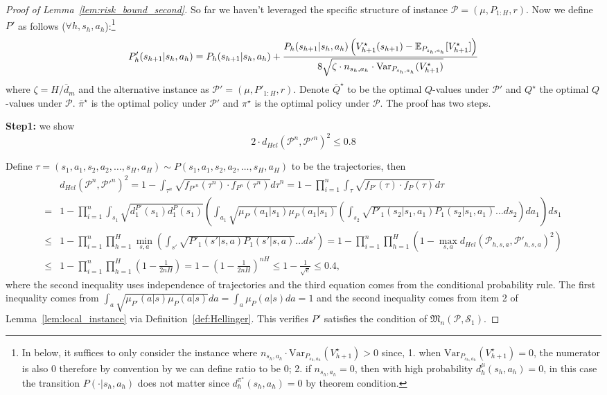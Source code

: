 \begin{proof}[Proof of Lemma~\ref{lem:risk_bound_second}]
So far we haven't leveraged the specific structure of instance $\mathcal{P}=(\mu,P_{1:H},r)$. Now we define $P'$ as follows ($\forall h,s_h,a_h$):\footnote{In below, it suffices to only consider the instance where $n_{s_h,a_h}\cdot\mathrm{Var}_{P_{s_h,a_h}}(V^\star_{h+1})>0$ since, 1. when $\mathrm{Var}_{P_{s_h,a_h}}(V^\star_{h+1})=0$, the numerator is also $0$ therefore by convention by we can define ratio to be $0$; 2. if $n_{s_h,a_h}=0$, then with high probability $d^\mu_h(s_h,a_h)=0$, in this case the transition $P(\cdot|s_h,a_h)$ does not matter since $d^{\pi^\star}_h(s_h,a_h)=0$ by theorem condition.}
\begin{equation}\label{eqn:definition_of_P_prime}
P'_h(s_{h+1}|s_h,a_h)=P_h(s_{h+1}|s_h,a_h)+\frac{P_h(s_{h+1}|s_h,a_h)\left(V_{h+1}^\star(s_{h+1})-\mathbb{E}_{P_{s_h,a_h}}[V_{h+1}^\star]\right)}{8\sqrt{\zeta\cdot n_{s_h,a_h}\cdot \mathrm{Var}_{P_{s_h,a_h}}(V_{h+1}^\star)}}
\end{equation}
where $\zeta = H/\bar{d}_m$ and the alternative instance as $\mathcal{P}'=(\mu,P'_{1:H},r)$. Denote $\bar{Q}^\star$ to be the optimal $Q$-values under $\mathcal{P}'$ and $Q^\star$ the optimal $Q$-values under $\mathcal{P}$. $\bar{\pi}^\star$ is the optimal policy under $\mathcal{P}'$ and ${\pi}^\star$ is the optimal policy under $\mathcal{P}$. The proof has two steps.

\textbf{Step1: } we show 
\[
2\cdot d_{Hel}(\mathcal{P}^n,\mathcal{P}'^n)^2\leq 0.8
\]

Define $\tau=(s_1,a_1,s_2,a_2,\ldots, s_H,a_H)\sim P(s_1,a_1,s_2,a_2,\ldots, s_H,a_H)$ to be the trajectories, then
{\small
\begin{equation}\label{eqn:hel_p}
\begin{aligned}
&d_{Hel}(\mathcal{P}^n,\mathcal{P}'^n)^2=1-\int_{\tau^n}\sqrt{f_{P'^n}(\tau^n)\cdot f_{P^n}(\tau^n)}d\tau^n
=1-\prod_{i=1}^n \int_{\tau}\sqrt{f_{P'}(\tau)\cdot f_{P}(\tau)}d\tau\\
=&1-\prod_{i=1}^n\int_{s_1}\sqrt{d_1^{P'}(s_1)d_1^P(s_1)}\left(\int_{a_1}\sqrt{\mu_{P'}(a_1|s_1)\mu_P(a_1|s_1)}\left(\int_{s_2}\sqrt{{P'}_1(s_2|s_1,a_1)P_1(s_2|s_1,a_1)}\ldots ds_2\right)da_1\right)ds_1\\
\leq &1-\prod_{i=1}^n\prod_{h=1}^H \min_{s,a} \left(\int_{s'}\sqrt{{P'}_1(s'|s,a)P_1(s'|s,a)}\ldots ds'\right)=1-\prod_{i=1}^n \prod_{h=1}^H(1-\max_{s,a} d_{Hel}(\mathcal{P}_{h,s,a},\mathcal{P}'_{h,s,a})^2)\\
\leq &1-\prod_{i=1}^n\prod_{h=1}^H\left(1-\frac{1}{2nH}\right)=1-\left(1-\frac{1}{2nH}\right)^{nH}\leq 1-\frac{1}{\sqrt{e}}\leq 0.4,
\end{aligned}
\end{equation}
}where the second inequality uses independence of trajectories and the third equation comes from the conditional probability rule. The first inequality comes from $\int_a \sqrt{\mu_{P'}(a|s)\mu_P(a|s)}da=\int_a \mu_{P}(a|s)da=1$ and the second inequality comes from item 2 of Lemma~\ref{lem:local_instance} via Definition~\ref{def:Hellinger}. This verifies $P'$ satisfies the condition of $\mathfrak{M}_n(\mathcal{P},\mathcal{S}_1)$.







\end{proof}
